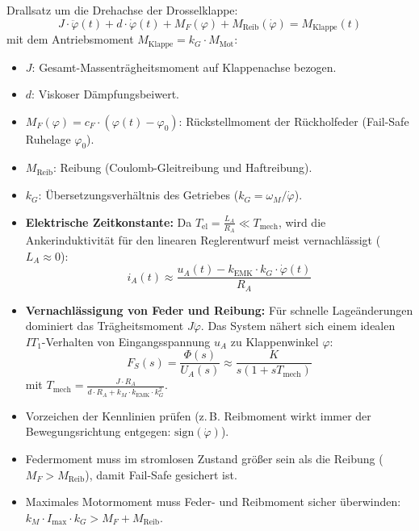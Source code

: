 \begin{tcolorbox}
Drallsatz um die Drehachse der Drosselklappe:
\[
J \cdot \ddot{\varphi}(t) + d \cdot \dot{\varphi}(t) + M_F(\varphi) + M_{\text{Reib}}(\dot{\varphi}) = M_{\text{Klappe}}(t)
\]
mit dem Antriebsmoment $M_{\text{Klappe}} = k_G \cdot M_{\text{Mot}}$:
\begin{itemize}
  \item $J$: Gesamt-Massenträgheitsmoment auf Klappenachse bezogen.
  \item $d$: Viskoser Dämpfungsbeiwert.
  \item $M_F(\varphi) = c_F \cdot (\varphi(t) - \varphi_0)$: Rückstellmoment der Rückholfeder (Fail-Safe Ruhelage $\varphi_0$).
  \item $M_{\text{Reib}}$: Reibung (Coulomb-Gleitreibung und Haftreibung).
  \item $k_G$: Übersetzungsverhältnis des Getriebes ($k_G = \omega_M / \dot{\varphi}$).
\end{itemize}
\end{tcolorbox}

\begin{tcolorbox}
\begin{itemize}
  \item \textbf{Elektrische Zeitkonstante:} Da $T_{\text{el}} = \frac{L_A}{R_A} \ll T_{\text{mech}}$, wird die Ankerinduktivität für den linearen Reglerentwurf meist vernachlässigt ($L_A \approx 0$):
  \[
  i_A(t) \approx \frac{u_A(t) - k_{\text{EMK}} \cdot k_G \cdot \dot{\varphi}(t)}{R_A}
  \]
  \item \textbf{Vernachlässigung von Feder und Reibung:}
  Für schnelle Lageänderungen dominiert das Trägheitsmoment $J \ddot{\varphi}$. Das System nähert sich einem idealen $IT_1$-Verhalten von Eingangsspannung $u_A$ zu Klappenwinkel $\varphi$:
  \[
  F_S(s) = \frac{\Phi(s)}{U_A(s)} \approx \frac{K}{s (1 + s T_{\text{mech}})}
  \]
  mit $T_{\text{mech}} = \frac{J \cdot R_A}{d \cdot R_A + k_M \cdot k_{\text{EMK}} \cdot k_G^2}$.
\end{itemize}
\end{tcolorbox}

\begin{tcolorbox}
\begin{itemize}
  \item Vorzeichen der Kennlinien prüfen (z.\,B. Reibmoment wirkt immer der Bewegungsrichtung entgegen: $\text{sign}(\dot{\varphi})$).
  \item Federmoment muss im stromlosen Zustand größer sein als die Reibung ($M_F > M_{\text{Reib}}$), damit Fail-Safe gesichert ist.
  \item Maximales Motormoment muss Feder- und Reibmoment sicher überwinden: $k_M \cdot I_{\max} \cdot k_G > M_F + M_{\text{Reib}}$.
\end{itemize}
\end{tcolorbox}
